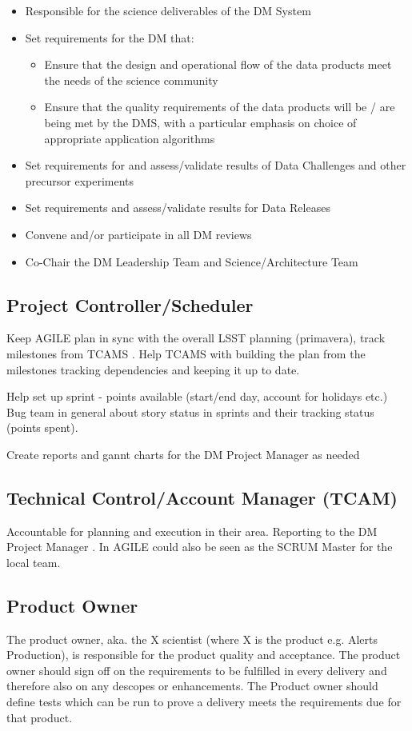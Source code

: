 \begin{itemize}
\item Responsible for the science deliverables of the DM System
\item Set requirements for the DM that:
\begin{itemize}
\item Ensure that the design and operational flow of the data products meet the needs of the science community
\item Ensure that the quality requirements of the data products will be / are being met by the DMS, with a particular emphasis on choice of appropriate application algorithms
\end{itemize}
\item Set requirements for and assess/validate results of Data Challenges and other precursor experiments
\item Set requirements and assess/validate results for Data Releases
\item Convene and/or participate in all DM reviews
\item Co-Chair the DM Leadership Team and Science/Architecture Team
\end{itemize}

\subsection{ Project Controller/Scheduler \label{role:pcon}}
Keep AGILE plan in sync with the overall LSST planning (primavera), track milestones from TCAMS . 
Help TCAMS with building the plan from the milestones tracking dependencies and keeping it up to date. 

Help set up sprint - points available (start/end day, account for holidays etc.) 
Bug team in general about story status in sprints and their tracking status (points spent).

Create reports and gannt charts for the DM Project Manager as needed 
\subsection{Technical Control/Account Manager (TCAM) \label{role:tcam} }
Accountable for planning and execution in their area. Reporting to the DM Project Manager . In AGILE could also be seen as the SCRUM Master for the local team.

\subsection{ Product Owner \label{role:prodo }}
The product owner, aka. the X scientist (where X is the product e.g. Alerts Production), is responsible for the product quality and acceptance. 
The product owner should sign off on the requirements to be fulfilled in every delivery and therefore also on any descopes or enhancements. 
The Product owner should define tests which can be run to prove a delivery meets the requirements due for that product. 

